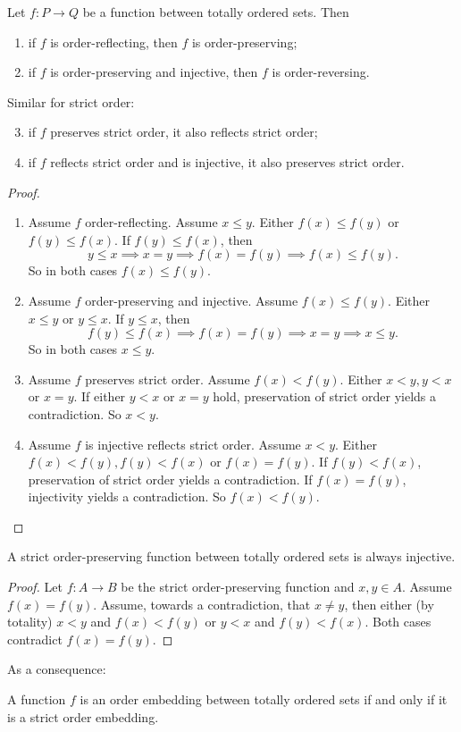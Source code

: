 \begin{lemma} \label{lemma:equivalenceOrderPreservingReflecting}
Let $f: P\to Q$ be a function between totally ordered sets. Then
\begin{enumerate}
\item if $f$ is order-reflecting, then $f$ is order-preserving;
\item if $f$ is order-preserving and injective, then $f$ is order-reversing.
\end{enumerate}
Similar for strict order:
\begin{enumerate}
\setcounter{enumi}{2}
\item if $f$ preserves strict order, it also reflects strict order;
\item if $f$ reflects strict order and is injective, it also preserves strict order.
\end{enumerate}
\end{lemma}
\begin{proof}
\hspace{1em}
\begin{enumerate}
\item Assume $f$ order-reflecting. Assume $x\leq y$. Either $f(x)\leq f(y)$ or $f(y)\leq f(x)$. If $f(y)\leq f(x)$, then
\[ y\leq x \implies x=y \implies f(x)=f(y) \implies f(x)\leq f(y). \]
So in both cases $f(x)\leq f(y)$.
\item Assume $f$ order-preserving and injective. Assume $f(x)\leq f(y)$. Either $x\leq y$ or $y\leq x$. If $y\leq x$, then
\[ f(y)\leq f(x) \implies f(x)=f(y) \implies x= y \implies x\leq y. \]
So in both cases $x\leq y$.
\item Assume $f$ preserves strict order. Assume $f(x) < f(y)$. Either $x<y, y<x$ or $x=y$. If either $y<x$ or $x=y$ hold, preservation of strict order yields a contradiction. So $x<y$.
\item Assume $f$ is injective reflects strict order. Assume $x < y$. Either $f(x)<f(y), f(y)<f(x)$ or $f(x)=f(y)$. If $f(y)<f(x)$, preservation of strict order yields a contradiction. If $f(x)=f(y)$, injectivity yields a contradiction. So $f(x)<f(y)$.
\end{enumerate}
\end{proof}

\begin{lemma} \label{lemma:strictOrderPreservationIsInjective}
A strict order-preserving function between totally ordered sets is always injective.
\end{lemma}
\begin{proof}
Let $f:A\to B$ be the strict order-preserving function and $x,y\in A$. Assume $f(x)=f(y)$. Assume, towards a contradiction, that $x\neq y$, then either (by totality) $x< y$ and $f(x) < f(y)$ or $y < x$ and $f(y)<f(x)$. Both cases contradict $f(x)=f(y)$.
\end{proof}
As a consequence:
\begin{lemma}
A function $f$ is an order embedding between totally ordered sets \textup{if and only if} it is a strict order embedding.
\end{lemma}

